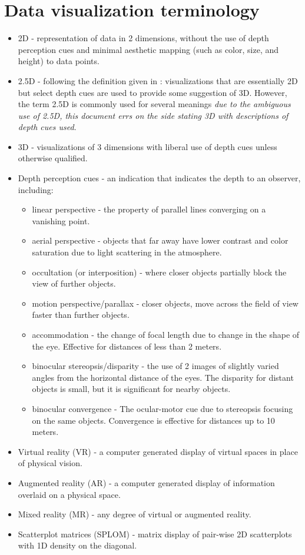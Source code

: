 \documentclass{monashthesis}
\begin{document}
\section{Data visualization terminology}\label{sec:3d-terminology}

\begin{itemize}
\tightlist
\item
  2D - representation of data in 2 dimensions, without the use of depth
  perception cues and minimal aesthetic mapping (such as color, size,
  and height) to data points.
\item
  2.5D - following the definition given in
  \textcite{ware_designing_2000}: visualizations that are essentially 2D
  but select depth cues are used to provide some suggestion of 3D.
  However, the term 2.5D is commonly used for several meanings \emph{due
  to the ambiguous use of 2.5D, this document errs on the side stating
  3D with descriptions of depth cues used}.
\item
  3D - visualizations of 3 dimensions with liberal use of depth cues
  unless otherwise qualified.
\item
  Depth perception cues - an indication that indicates the depth to an
  observer, including:

  \begin{itemize}
  \tightlist
  \item
    linear perspective - the property of parallel lines converging on a
    vanishing point.
  \item
    aerial perspective - objects that far away have lower contrast and
    color saturation due to light scattering in the atmosphere.
  \item
    occultation (or interposition) - where closer objects partially
    block the view of further objects.
  \item
    motion perspective/parallax - closer objects, move across the field
    of view faster than further objects.
  \item
    accommodation - the change of focal length due to change in the
    shape of the eye. Effective for distances of less than 2 meters.
  \item
    binocular stereopsis/disparity - the use of 2 images of slightly
    varied angles from the horizontal distance of the eyes. The
    disparity for distant objects is small, but it is significant for
    nearby objects.
  \item
    binocular convergence - The ocular-motor cue due to stereopsis
    focusing on the same objects. Convergence is effective for distances
    up to 10 meters.
  \end{itemize}
\item
  Virtual reality (VR) - a computer generated display of virtual spaces
  in place of physical vision.
\item
  Augmented reality (AR) - a computer generated display of information
  overlaid on a physical space.
\item
  Mixed reality (MR) - any degree of virtual or augmented reality.
\item
  Scatterplot matrices (SPLOM) - matrix display of pair-wise 2D
  scatterplots with 1D density on the diagonal.
\end{itemize}
\end{document}
